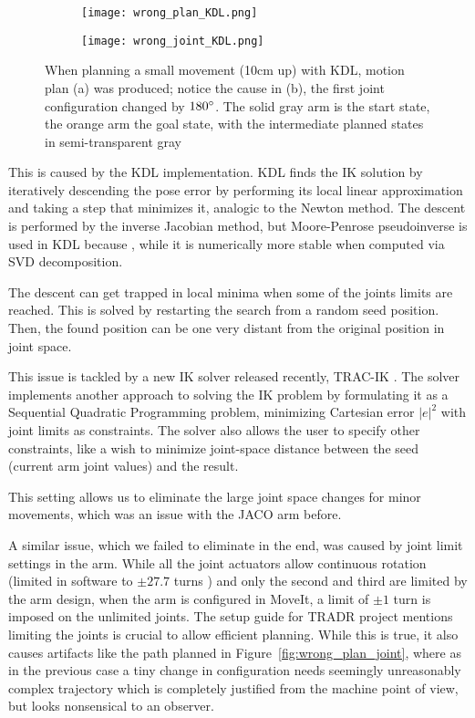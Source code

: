 \documentclass[buriama8_dp.tex]{subfiles}
\begin{document}
\begin{figure}[htp]
  \centering
  \begin{subfigure}[t]{0.49\textwidth}
    \texttt{[image: wrong\_plan\_KDL.png]}
    \caption{}
    \label{fig:wron_plan}
  \end{subfigure}
  \begin{subfigure}[t]{0.49\textwidth}
    \texttt{[image: wrong\_joint\_KDL.png]}
    \caption{}
    \label{fig:wrong_joint}
  \end{subfigure}

  \caption[Non-optimal motion plan]{When planning a small movement (10cm up) with KDL, motion plan (a) was produced; notice the cause in (b), the first joint configuration changed by \(180^\circ\). The solid gray arm is the start state, the orange arm the goal state, with the intermediate planned states in semi-transparent gray}
  \label{fig:wrong_planning}
\end{figure}

This is caused by the KDL implementation. KDL finds the IK solution by iteratively descending the pose error by performing its local linear approximation\cite{tracik}  and taking a step that minimizes it, analogic to the Newton method. The descent is performed by the inverse Jacobian method, but Moore-Penrose pseudoinverse is used in KDL because , while it is numerically more stable when computed via SVD decomposition.

The descent can get trapped in local minima when some of the joints limits are reached. This is solved by restarting the search from a random seed position. Then, the found position can be one very distant from the original position in joint space.

This issue is tackled by a new IK solver released recently, TRAC-IK \cite{tracik}. The solver implements another approach to solving the IK problem by formulating it as a Sequential Quadratic Programming problem, minimizing Cartesian error \(|e|^2\) with joint limits as constraints. The solver also allows the user to specify other constraints, like a wish to minimize joint-space distance between the seed (current arm joint values) and the result.

This setting allows us to eliminate the large joint space changes for minor movements, which was an issue with the JACO arm before.

A similar issue, which we failed to eliminate in the end, was caused by joint limit settings in the arm. While all the joint actuators allow continuous rotation (limited in software to \(\pm 27.7\) turns \cite{jaco_spec}) and only the second and third are limited by the arm design, when the arm is configured in MoveIt, a limit of \(\pm 1\) turn is imposed on the unlimited joints. The setup guide for TRADR project mentions limiting the joints is crucial to allow efficient planning. While this is true, it also causes artifacts like the path planned in Figure~\ref{fig:wrong_plan_joint}, where as in the previous case a tiny change in configuration needs seemingly unreasonably complex trajectory which is completely justified from the machine point of view, but looks nonsensical to an observer.
\end{document}
